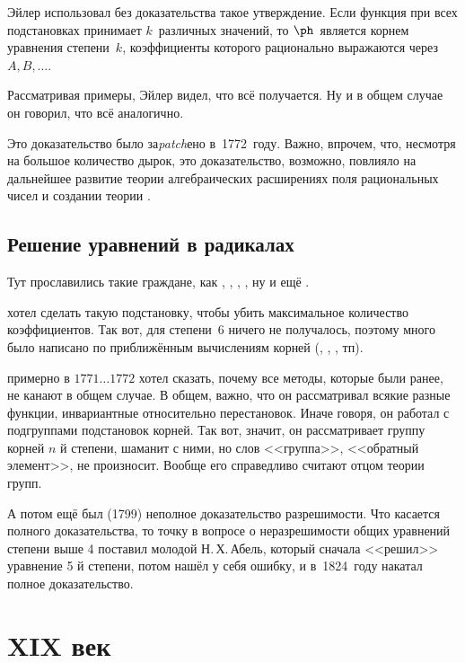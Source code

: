 \documentclass[a4paper,oneside,fleqn,10pt]{article}
\newcommand{\pe}[2]{${#1}\ldots{#2}$}
\begin{document}
Эйлер использовал без доказательства такое утверждение.
Если функция при всех подстановках принимает $k$~различных значений, то $\ph$~является
корнем уравнения степени~$k$, коэффициенты которого рационально выражаются через $A, B, \dots$.

Рассматривая примеры, Эйлер видел, что всё получается. Ну и в общем случае он говорил,
что всё аналогично.

Это доказательство было за\emph{patch}ено  в~1772~году.
Важно, впрочем, что, несмотря на большое количество дырок, это доказательство,
возможно, повлияло на дальнейшее развитие теории алгебраических расширениях
поля рациональных чисел и создании теории .

\subsection{Решение уравнений в радикалах}

Тут прославились такие граждане, как , , , ,
ну и ещё .

 хотел сделать такую подстановку, чтобы убить максимальное количество коэффициентов.
Так вот, для степени~6 ничего не получалось, поэтому много было написано по
приближённым вычислениям корней (, , , тп).

 примерно в \pe{1771}{1772} хотел сказать, почему все методы, которые были ранее, не канают
в общем случае. В общем, важно, что он рассматривал всякие разные функции, инвариантные
относительно перестановок. Иначе говоря, он работал с подгруппами подстановок корней.
Так вот, значит, он рассматривает группу корней $n$ й степени, шаманит с ними,
но слов <<группа>>, <<обратный элемент>>, не произносит.
Вообще его справедливо считают отцом теории групп.

А потом ещё был  (1799) неполное доказательство разрешимости.
Что касается полного доказательства, то точку в вопросе о неразрешимости общих
уравнений степени выше 4 поставил молодой Н.\,Х.\,Абель, который сначала <<решил>>
уравнение 5 й степени, потом нашёл у себя ошибку, и в~1824~году накатал полное доказательство.



\section{XIX век}
\end{document}
